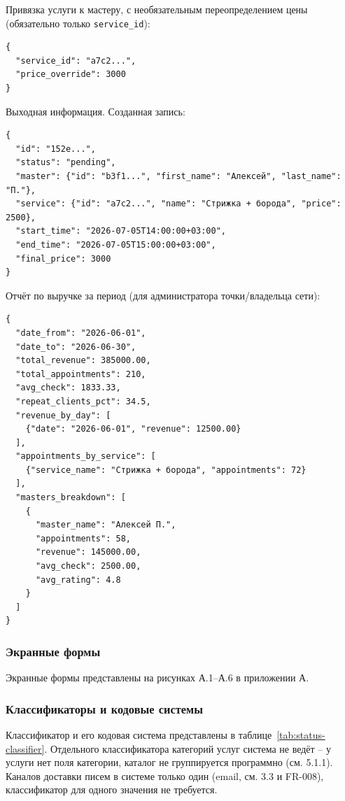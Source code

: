Привязка услуги к мастеру, с необязательным переопределением цены (обязательно только \texttt{service\_id}):
\begin{footnotesize}
\begin{verbatim}
{
  "service_id": "a7c2...",
  "price_override": 3000
}
\end{verbatim}
\end{footnotesize}

Выходная информация. Созданная запись:
\begin{footnotesize}
\begin{verbatim}
{
  "id": "152e...",
  "status": "pending",
  "master": {"id": "b3f1...", "first_name": "Алексей", "last_name": "П."},
  "service": {"id": "a7c2...", "name": "Стрижка + борода", "price": 2500},
  "start_time": "2026-07-05T14:00:00+03:00",
  "end_time": "2026-07-05T15:00:00+03:00",
  "final_price": 3000
}
\end{verbatim}
\end{footnotesize}

Отчёт по выручке за период (для администратора точки/владельца сети):
\begin{footnotesize}
\begin{verbatim}
{
  "date_from": "2026-06-01",
  "date_to": "2026-06-30",
  "total_revenue": 385000.00,
  "total_appointments": 210,
  "avg_check": 1833.33,
  "repeat_clients_pct": 34.5,
  "revenue_by_day": [
    {"date": "2026-06-01", "revenue": 12500.00}
  ],
  "appointments_by_service": [
    {"service_name": "Стрижка + борода", "appointments": 72}
  ],
  "masters_breakdown": [
    {
      "master_name": "Алексей П.",
      "appointments": 58,
      "revenue": 145000.00,
      "avg_check": 2500.00,
      "avg_rating": 4.8
    }
  ]
}
\end{verbatim}
\end{footnotesize}

\subsubsection{Экранные формы}

Экранные формы представлены на рисунках А.1--А.6 в приложении А.

\subsubsection{Классификаторы и кодовые системы}

Классификатор и его кодовая система представлены в таблице~\ref{tab:status-classifier}. Отдельного классификатора категорий услуг система не ведёт -- у услуги нет поля категории, каталог не группируется программно (см. 5.1.1). Каналов доставки писем в системе только один (email, см. 3.3 и FR-008), классификатор для одного значения не требуется.

